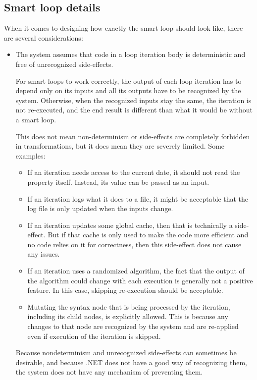 \subsection{Smart loop details}

When it comes to designing how exactly the smart  loop should look like, there are several considerations:

\begin{itemize}
\item The system assumes that code in a loop iteration body is deterministic and free of unrecognized side-effects.

For smart loops to work correctly, the output of each loop iteration has to depend only on its inputs and all its outputs have to be recognized by the system. Otherwise, when the recognized inputs stay the same, the iteration is not re-executed, and the end result is different than what it would be without a smart loop.

This does not mean non-determinism or side-effects are completely forbidden in transformations, but it does mean they are severely limited. Some examples:

\begin{itemize}
\item If an iteration needs access to the current date, it should not read the  property itself. Instead, its value can be passed as an input.
\item If an iteration logs what it does to a file, it might be acceptable that the log file is only updated when the inputs change.
\item If an iteration updates some global cache, then that is technically a side-effect. But if that cache is only used to make the code more efficient and no code relies on it for correctness, then this side-effect does not cause any issues.
\item If an iteration uses a randomized algorithm, the fact that the output of the algorithm could change with each execution is generally not a positive feature. In this case, skipping re-execution should be acceptable.
\item Mutating the syntax node that is being processed by the iteration, including its child nodes, is explicitly allowed. This is because any changes to that node are recognized by the system and are re-applied even if execution of the iteration is skipped.
\end{itemize}

Because nondeterminism and unrecognized side-effects can sometimes be desirable, and because .NET does not have a good way of recognizing them, the system does not have any mechanism of preventing them.


\end{itemize}
